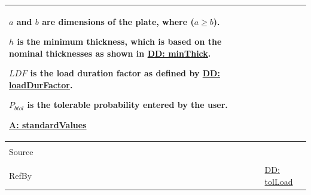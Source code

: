 \documentclass[12pt]{article}
\begin{document}
\begin{minipage}{\textwidth}
\begin{tabular}{>{\raggedright}p{}>{\raggedright\arraybackslash}p{}}
        $a$ and $b$ are dimensions of the plate, where ($a\geq{}b$).
        
        $h$ is the minimum thickness, which is based on the nominal thicknesses as shown in \hyperref[DD:minThick]{DD: minThick}.
        
        $LDF$ is the load duration factor as defined by \hyperref[DD:loadDurFactor]{DD: loadDurFactor}.
        
        ${P_{btol}}$ is the tolerable probability entered by the user.
        
        \hyperref[assumpSV]{A: standardValues}
        
\\ \midrule \\
Source & \cite{astm2009}
         
\\ \midrule \\
RefBy & \hyperref[DD:tolLoad]{DD: tolLoad}
        
\\ \bottomrule
\end{tabular}
\end{minipage}
\end{document}
